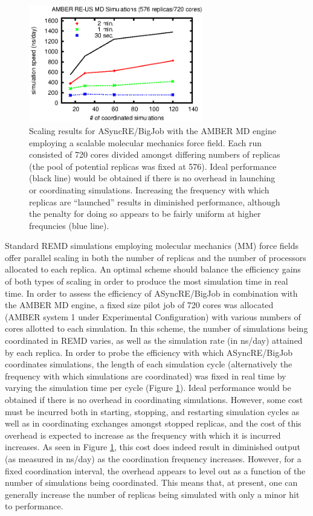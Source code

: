 \begin{figure}
\includegraphics[width=3in]{amber_data/amber_mm.eps}
\caption{
  Scaling results for ASyncRE/BigJob with the AMBER MD engine employing a
  scalable molecular mechanics force field. Each run consisted of 720 cores
  divided amongst differing numbers of replicas (the pool of potential 
  replicas was fixed at 576). Ideal performance (black line) would be obtained
  if there is no overhead in launching or coordinating simulations. Increasing
  the frequency with which replicas are ``launched'' results in diminished
  performance, although the penalty for doing so appears to be fairly uniform
  at higher frequncies (blue line).
  \label{fig:amber_mm}  
}
\end{figure}

Standard REMD simulations employing molecular mechanics (MM) force fields offer 
parallel scaling in both the number of replicas and the number of processors 
allocated to each replica. An optimal scheme should balance the efficiency 
gains of both types of scaling in order to produce the most simulation time in 
real time. In order to assess the efficiency of ASyncRE/BigJob in combination 
with the AMBER MD engine, a fixed size pilot job of 720 cores was allocated 
(AMBER system 1 under Experimental Configuration) with various numbers of cores
allotted to each simulation. In this scheme, the number of simulations being 
coordinated in REMD varies, as well as the simulation rate (in ns/day) attained
by each replica. In order to probe the efficiency with which ASyncRE/BigJob 
coordinates simulations, the length of each simulation cycle (alternatively the 
frequency with which simulations are coordinated) was fixed in real time by 
varying the simulation time per cycle (Figure \ref{fig:amber_mm}). Ideal
performance would be obtained if there is no overhead in coordinating 
simulations. However, some cost must be incurred both in starting, stopping,
and restarting simulation cycles as well as in coordinating exchanges amongst 
stopped replicas, and the cost of this overhead is expected to increase as the 
frequency with which it is incurred increases. As seen in Figure 
\ref{fig:amber_mm}, this cost does indeed result in diminished output (as 
measured in ns/day) as the coordination frequency increases. However, for a
fixed coordination interval, the overhead appears to level out as a function
of the number of simulations being coordinated. This means that, at present, 
one can generally increase the number of replicas being simulated with only a
minor hit to performance.

